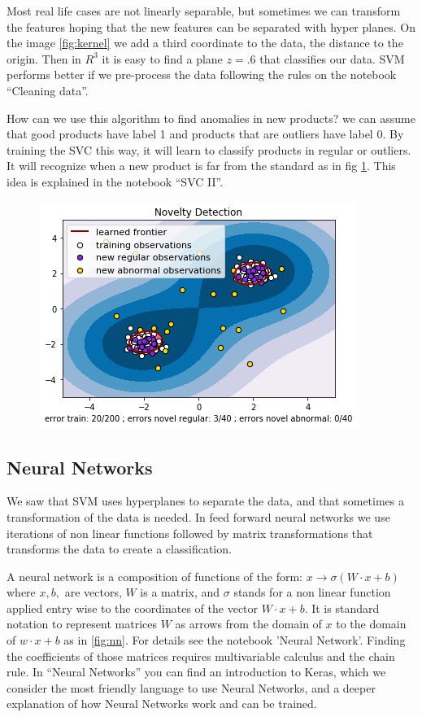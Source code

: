 \documentclass[11pt,letterpaper]{report}
\begin{document}
 Most real life cases are not linearly separable, but sometimes we can transform the features hoping that the new features can be separated  with hyper planes. On the image \ref{fig:kernel} we add a third coordinate to the data, the distance to the origin. Then in $R^3$ it is easy to find a plane $z=.6$ that classifies our data. SVM performs better if we pre-process the data following the rules on the notebook ``Cleaning data''. 
 
How can we use this algorithm to find anomalies in new products? we can assume that good products have label 1 and products that are outliers have label 0. By training the SVC this way, it will learn to classify products in regular or outliers. It will recognize when a new product is far from the standard as in fig \ref{fig:novelty}. This idea is explained in the notebook ``SVC II''. 
	
	\begin{figure}[h!]
		\centering
		\includegraphics[width=0.45\linewidth]{figures/novelty.png}
		\caption{}
		\label{fig:novelty}
	\end{figure} 
	
	\subsection{Neural Networks}  
	
	We saw that SVM uses  hyperplanes to separate the data, and that sometimes a transformation of the data is needed. In feed forward neural networks we use iterations of non linear functions followed by matrix transformations that transforms the data to create a classification.
	
	 A neural network is a composition of  functions of the form:
	$x\rightarrow \sigma(W\cdot x+b)$ where $x,b,$ are vectors, $W$ is a matrix, and $\sigma$ stands for a non linear function applied entry wise to the coordinates of the vector  $W\cdot x+b$.
	It is standard notation to represent matrices  $W$ as arrows from the domain of $x$ to the domain of $w\cdot x + b$ as in \ref{fig:nn}. For details see the notebook 'Neural Network'.
	 Finding the coefficients of those matrices requires multivariable calculus and the chain rule. In ``Neural Networks'' you can find an introduction to Keras, which we consider the most friendly language to use Neural Networks, and a deeper explanation of how Neural Networks work and can be trained.	
	
\end{document}
